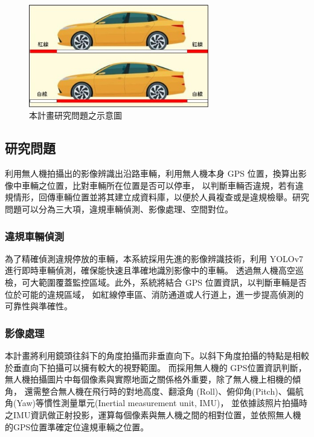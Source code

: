\documentclass[12pt]{article}       %
\renewcommand{\figurename}{圖}                           %
\begin{document}
\begin{figure}[H]
    \centering
    \renewcommand{\figurename}{圖} %
    \includegraphics[width=0.7\textwidth]{research_problem2.jpg}     %
    \caption{本計畫研究問題之示意圖}    %
    \label{fig:research_problem2}    %
\end{figure}

\subsection{研究問題} 
\hspace{2em}利用無人機拍攝出的影像辨識出沿路車輛，利用無人機本身 GPS 位置，換算出影像中車輛之位置，比對車輛所在位置是否可以停車，
以判斷車輛否違規，若有違規情形，回傳車輛位置並將其建立成資料庫，以便於人員複查或是違規檢舉。研究問題可以分為三大項，違規車輛偵測、影像處理、空間對位。

\subsubsection{違規車輛偵測}
\hspace{2em}為了精確偵測違規停放的車輛，本系統採用先進的影像辨識技術，利用 YOLOv7 進行即時車輛偵測，確保能快速且準確地識別影像中的車輛。
透過無人機高空巡檢，可大範圍覆蓋監控區域。此外，系統將結合 GPS 位置資訊，以判斷車輛是否位於可能的違規區域，
如紅線停車區、消防通道或人行道上，進一步提高偵測的可靠性與準確性。

\subsubsection{影像處理}
\hspace{2em}本計畫將利用鏡頭往斜下的角度拍攝而非垂直向下。以斜下角度拍攝的特點是相較於垂直向下拍攝可以擁有較大的視野範圍。
而採用無人機的 GPS位置資訊判斷，無人機拍攝圖片中每個像素與實際地面之關係格外重要，除了無人機上相機的傾角，
還需整合無人機在飛行時的對地高度、翻滾角 (Roll)、俯仰角(Pitch)、偏航角(Yaw)等慣性測量單元(Inertial measurement unit, IMU)，
並依據該照片拍攝時之IMU資訊做正射投影，運算每個像素與無人機之間的相對位置，並依照無人機的GPS位置準確定位違規車輛之位置。
\end{document}
